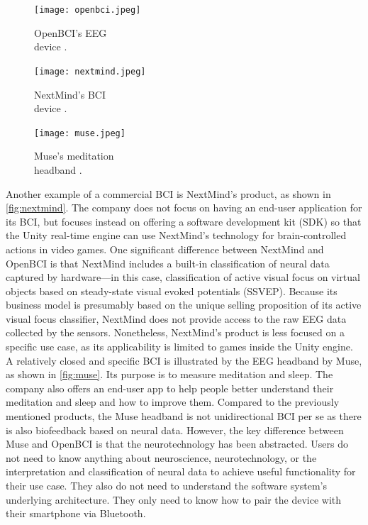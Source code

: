 \begin{figure}[!ht]
  \texttt{[image: openbci.jpeg]}
  \caption[OpenBCI’s EEG device.]{OpenBCI’s EEG \\ device \citep{be_superhvman_conor_2017}.}
  \label{fig:openbci}
  \endminipage\hfill
  \texttt{[image: nextmind.jpeg]}
  \caption[NextMind’s BCI device.]{NextMind’s BCI \\ device \citep{louise_neurotechnology_2019}.}
  \label{fig:nextmind}
  \endminipage\hfill
  \texttt{[image: muse.jpeg]}
  \caption[Muse’s meditation headband.]{Muse’s meditation \\ headband \citep{muse_muse_nodate}.}
  \label{fig:muse}
  \endminipage
\end{figure}

Another example of a commercial BCI is NextMind’s product, as shown in \autoref{fig:nextmind}. The company does not focus on having an end-user application for its BCI, but focuses instead on offering a software development kit (SDK) so that the Unity real-time engine can use NextMind’s technology for brain-controlled actions in video games. One significant difference between NextMind and OpenBCI is that NextMind includes a built-in classification of neural data captured by hardware—in this case, classification of active visual focus on virtual objects based on steady-state visual evoked potentials (SSVEP). Because its business model is presumably based on the unique selling proposition of its active visual focus classifier, NextMind does not provide access to the raw EEG data collected by the sensors. Nonetheless, NextMind’s product is less focused on a specific use case, as its applicability is limited to games inside the Unity engine. A relatively closed and specific BCI is illustrated by the EEG headband by Muse, as shown in \autoref{fig:muse}. Its purpose is to measure meditation and sleep. The company also offers an end-user app to help people better understand their meditation and sleep and how to improve them. Compared to the previously mentioned products, the Muse headband is not unidirectional BCI per se as there is also biofeedback based on neural data. However, the key difference between Muse and OpenBCI is that the neurotechnology has been abstracted. Users do not need to know anything about neuroscience, neurotechnology, or the interpretation and classification of neural data to achieve useful functionality for their use case. They also do not need to understand the software system’s underlying architecture. They only need to know how to pair the device with their smartphone via Bluetooth.

